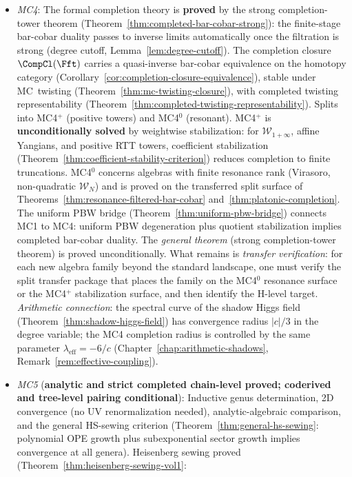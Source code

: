 \begin{remark}
\begin{itemize}
\item \emph{MC4}: The formal completion theory is \textbf{proved} by
 the strong completion-tower theorem
 (Theorem~\ref{thm:completed-bar-cobar-strong}): the finite-stage
 bar-cobar duality passes to inverse limits automatically once the
 filtration is strong (degree cutoff, Lemma~\ref{lem:degree-cutoff}).
 The completion closure $\CompCl(\Fft)$ carries a quasi-inverse
 bar-cobar equivalence on the homotopy category
 (Corollary~\ref{cor:completion-closure-equivalence}), stable under
 MC~twisting (Theorem~\ref{thm:mc-twisting-closure}), with completed
 twisting representability
 (Theorem~\ref{thm:completed-twisting-representability}).
 Splits into MC4$^+$ (positive towers) and MC4$^0$ (resonant).
 MC4$^+$ is \textbf{unconditionally solved} by weightwise
 stabilization: for $\mathcal{W}_{1+\infty}$, affine Yangians, and
 positive RTT towers, coefficient stabilization
 (Theorem~\ref{thm:coefficient-stability-criterion}) reduces
 completion to finite truncations. MC4$^0$ concerns algebras with
 finite resonance rank (Virasoro, non-quadratic
 $\mathcal{W}_N$) and is proved on the transferred split surface of
 Theorems~\ref{thm:resonance-filtered-bar-cobar}
 and~\ref{thm:platonic-completion}. The uniform
 PBW bridge (Theorem~\ref{thm:uniform-pbw-bridge}) connects MC1
 to MC4: uniform PBW degeneration plus quotient stabilization
 implies completed bar-cobar duality.
 The \emph{general theorem} (strong completion-tower
 theorem) is proved unconditionally. What remains is
 \emph{transfer verification}: for each new
 algebra family beyond the standard landscape, one must
 verify the split transfer package that places the family on
 the MC4$^0$ resonance surface or the MC4$^+$ stabilization
 surface, and then identify the H-level target.
 \emph{Arithmetic connection}: the spectral curve of the shadow
 Higgs field
 (Theorem~\ref{thm:shadow-higgs-field}) has convergence
 radius $|c|/3$ in the degree variable;
 the MC4 completion radius is controlled by the same parameter
 $\lambda_{\mathrm{eff}} = -6/c$
 (Chapter~\ref{chap:arithmetic-shadows},
 Remark~\ref{rem:effective-coupling}).
\item \emph{MC5} (\textbf{analytic and strict completed chain-level proved; coderived and tree-level pairing conditional}):
 Inductive genus
 determination, 2D convergence (no UV renormalization needed),
 analytic-algebraic comparison, and the general HS-sewing criterion
 (Theorem~\ref{thm:general-hs-sewing}: polynomial OPE growth
 plus subexponential sector growth implies convergence at all genera).
 Heisenberg sewing proved (Theorem~\ref{thm:heisenberg-sewing-vol1}:

\end{itemize}
\end{remark}
